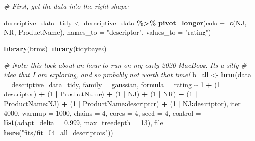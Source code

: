 \documentclass[
]{book}
\newenvironment{Shaded}{\begin{snugshade}}{\end{snugshade}}
\newcommand{\AttributeTok}[1]{\textcolor[rgb]{0.13,0.29,0.53}{#1}}
\newcommand{\CommentTok}[1]{\textcolor[rgb]{0.56,0.35,0.01}{\textit{#1}}}
\newcommand{\DecValTok}[1]{\textcolor[rgb]{0.00,0.00,0.81}{#1}}
\newcommand{\FloatTok}[1]{\textcolor[rgb]{0.00,0.00,0.81}{#1}}
\newcommand{\FunctionTok}[1]{\textcolor[rgb]{0.13,0.29,0.53}{\textbf{#1}}}
\newcommand{\NormalTok}[1]{#1}
\newcommand{\OtherTok}[1]{\textcolor[rgb]{0.56,0.35,0.01}{#1}}
\newcommand{\SpecialCharTok}[1]{\textcolor[rgb]{0.81,0.36,0.00}{\textbf{#1}}}
\newcommand{\StringTok}[1]{\textcolor[rgb]{0.31,0.60,0.02}{#1}}
\begin{document}
\begin{Shaded}
\begin{Highlighting}[]
\CommentTok{\# First, get the data into the right shape:}

\NormalTok{descriptive\_data\_tidy }\OtherTok{\textless{}{-}} 
\NormalTok{  descriptive\_data }\SpecialCharTok{\%\textgreater{}\%}
  \FunctionTok{pivot\_longer}\NormalTok{(}\AttributeTok{cols =} \SpecialCharTok{{-}}\FunctionTok{c}\NormalTok{(NJ, NR, ProductName),}
               \AttributeTok{names\_to =} \StringTok{"descriptor"}\NormalTok{,}
               \AttributeTok{values\_to =} \StringTok{"rating"}\NormalTok{)}

\FunctionTok{library}\NormalTok{(brms)}
\FunctionTok{library}\NormalTok{(tidybayes)}

\CommentTok{\# Note: this took about an hour to run on my early{-}2020 MacBook.  It\textquotesingle{}s a silly}
\CommentTok{\# idea that I am exploring, and so probably not worth that time!}
\NormalTok{b\_all }\OtherTok{\textless{}{-}} 
  \FunctionTok{brm}\NormalTok{(}\AttributeTok{data =}\NormalTok{ descriptive\_data\_tidy,}
      \AttributeTok{family =}\NormalTok{ gaussian,}
      \AttributeTok{formula =}\NormalTok{ rating }\SpecialCharTok{\textasciitilde{}} \DecValTok{1} \SpecialCharTok{+}\NormalTok{ (}\DecValTok{1} \SpecialCharTok{|}\NormalTok{ descriptor) }\SpecialCharTok{+}\NormalTok{ (}\DecValTok{1} \SpecialCharTok{|}\NormalTok{ ProductName) }\SpecialCharTok{+}\NormalTok{ (}\DecValTok{1} \SpecialCharTok{|}\NormalTok{ NJ) }\SpecialCharTok{+}\NormalTok{ (}\DecValTok{1} \SpecialCharTok{|}\NormalTok{ NR) }\SpecialCharTok{+} 
\NormalTok{        (}\DecValTok{1} \SpecialCharTok{|}\NormalTok{ ProductName}\SpecialCharTok{:}\NormalTok{NJ) }\SpecialCharTok{+}\NormalTok{ (}\DecValTok{1} \SpecialCharTok{|}\NormalTok{ ProductName}\SpecialCharTok{:}\NormalTok{descriptor) }\SpecialCharTok{+}\NormalTok{ (}\DecValTok{1} \SpecialCharTok{|}\NormalTok{ NJ}\SpecialCharTok{:}\NormalTok{descriptor),}
      \AttributeTok{iter =} \DecValTok{4000}\NormalTok{, }\AttributeTok{warmup =} \DecValTok{1000}\NormalTok{, }\AttributeTok{chains =} \DecValTok{4}\NormalTok{, }\AttributeTok{cores =} \DecValTok{4}\NormalTok{, }\AttributeTok{seed =} \DecValTok{4}\NormalTok{,}
      \AttributeTok{control =} \FunctionTok{list}\NormalTok{(}\AttributeTok{adapt\_delta =} \FloatTok{0.999}\NormalTok{, }\AttributeTok{max\_treedepth =} \DecValTok{13}\NormalTok{),}
      \AttributeTok{file =} \FunctionTok{here}\NormalTok{(}\StringTok{"fits/fit\_04\_all\_descriptors"}\NormalTok{))}
\end{Highlighting}
\end{Shaded}
\end{document}
